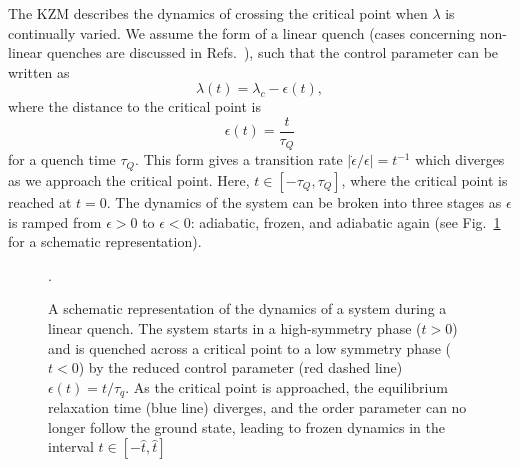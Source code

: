 The KZM describes the dynamics of crossing the critical point when \( \lambda \)
is continually varied.
We assume the form of a linear quench (cases concerning non-linear quenches are
discussed in Refs.~\cite{Barankov2008,Mondal2009}), such that the control
parameter can be written as
\begin{equation}
    \lambda(t) = \lambda_c - \epsilon(t),
\end{equation}
where the distance to the critical point is
\begin{equation}
    \epsilon(t) = \frac{t}{\tau_Q}
    \label{eq: time-dependent-epsilon}
\end{equation}
for a quench time \( \tau_Q \).
This form gives a transition rate \( |\dot{\epsilon}/{\epsilon}|=t^{-1} \) which
diverges as we approach the critical point.
Here, \( t \in [-\tau_Q, \tau_Q] \), where the critical point is reached at
\( t=0 \).
The dynamics of the system can be broken into three stages as \( \epsilon \) is
ramped from \( \epsilon > 0 \) to \( \epsilon < 0 \): adiabatic, frozen, and
adiabatic again (see Fig.~\ref{fig: adiabatic-impulse} for a schematic
representation).
\begin{figure}
    \centering
    \caption[Schematic representation of the dynamics of a system during a
        linear quench]
    {A schematic representation of the dynamics of a system during a
        linear quench. The system starts in a high-symmetry phase (\( t > 0 \)) and
        is quenched across a critical point to a low symmetry phase (\( t < 0 \)) by
        the reduced control parameter (red dashed line) \( \epsilon(t) = t/\tau_q \).
        As the critical point is approached, the equilibrium relaxation time
        (blue line) diverges, and the order parameter can no longer follow the
        ground state, leading to frozen dynamics in the interval
        \( t \in [-\hat{t}, \hat{t}] \)}.\label{fig: adiabatic-impulse}
\end{figure}

